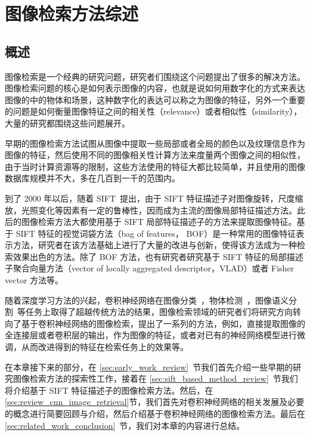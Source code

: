 
\chapter{图像检索方法综述}\label{chapter:overview_related_work}

\section{概述}
图像检索是一个经典的研究问题，研究者们围绕这个问题提出了很多的解决方法。图像检索问题的核心是如何表示图像的内容，也就是说如何用数字化的方式来表达图像的中的物体和场景，这种数字化的表达可以称之为图像的特征，另外一个重要的问题是如何衡量图像特征之间的相关性（relevance）或者相似性（similarity），大量的研究都围绕这些问题展开。

早期的图像检索方法试图从图像中提取一些局部或者全局的颜色以及纹理信息作为图像的特征，然后使用不同的图像相关性计算方法来度量两个图像之间的相似性，由于当时计算资源等的限制，这些方法使用的特征大都比较简单，并且使用的图像数据库规模并不大，多在几百到一千的范围内。

到了 2000 年以后，随着 SIFT~\cite{Lowe1999ObjectRF}提出，由于 SIFT 特征描述子对图像旋转，尺度缩放，光照变化等因素有一定的鲁棒性，因而成为主流的图像局部特征描述方法。此后的图像检索方法大都使用基于 SIFT 局部特征描述子的方法来提取图像特征。基于 SIFT 特征的视觉词袋方法（bag of features， BOF）是一种常用的图像特征表示方法，研究者在该方法基础上进行了大量的改进与创新，使得该方法成为一种检索效果出色的方法。除了 BOF 方法，也有研究者研究基于 SIFT 特征的局部描述子聚合向量方法（vector of locally aggregated descriptor，VLAD）或者 Fisher vector 方法等。

随着深度学习方法的兴起，卷积神经网络在图像分类~\cite{Russakovsky2015ImageNetLS,Simonyan2014VeryDC,Szegedy2015GoingDW,He2016DeepRL}，物体检测~\cite{Liu2016SSDSS,Redmon2016YouOL,Lin2017FocalLF,Ren2017FasterRT}，图像语义分割~\cite{Shelhamer2017FullyCN,Chen2018DeepLabSI,Noh2015LearningDN}等任务上取得了超越传统方法的结果，图像检索领域的研究者们将研究方向转向了基于卷积神经网络的图像检索，提出了一系列的方法，例如，直接提取图像的全连接层或者卷积层的输出，作为图像的特征，或者对已有的神经网络模型进行微调，从而改进得到的特征在检索任务上的效果等。

在本章接下来的部分，在 \ref{sec:early_work_review}~节我们首先介绍一些早期的研究图像检索方法的探索性工作，接着在 \ref{sec:sift_based_method_review}~节我们将介绍基于 SIFT 特征描述子的图像检索方法。然后，在 \ref{sec:review_cnn_image_retrieval}节，我们首先对卷积神经网络的相关发展及必要的概念进行简要回顾与介绍，然后介绍基于卷积神经网络的图像检索方法。最后在 \ref{sec:related_work_conclusion}~节，我们对本章的内容进行总结。

